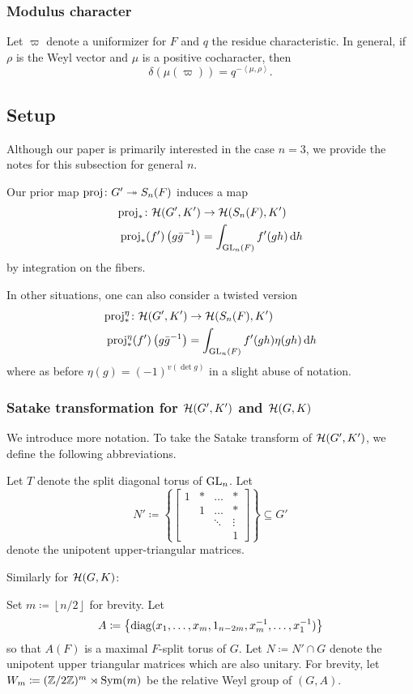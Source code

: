 \subsubsection{Modulus character}
Let $\varpi$ denote a uniformizer for $F$ and $q$ the residue characteristic.
In general, if $\rho$ is the Weyl vector and $\mu$ is a positive cocharacter, then
\[ \delta(\mu(\varpi)) = q^{- \left< \mu, \rho\right>}. \]

\subsection{Setup}
Although our paper is primarily interested in the case $n=3$,
we provide the notes for this subsection for general $n$.

Our prior map $\operatorname{proj} \colon G' \twoheadrightarrow S_n(F)$ induces a map
\begin{align*}
  \rproj_\ast \colon \HH(G', K') &\to \HH(S_n(F), K') \\
  \rproj_\ast(f')\left( g\bar{g}\inv \right) &= \int_{\GL_n(F)} f'(gh) \odif h
\end{align*}
by integration on the fibers.

In other situations, one can also consider a twisted version
\begin{align*}
  \rproj_\ast^\eta \colon \HH(G', K') &\to \HH(S_n(F), K') \\
  \rproj_\ast^\eta(f')\left( g\bar{g}\inv \right) &= \int_{\GL_n(F)} f'(gh) \eta(gh) \odif h
\end{align*}
where as before $\eta(g) = (-1)^{v(\det g)}$ in a slight abuse of notation.

\subsubsection{Satake transformation for $\mathcal H(G',K')$ and $\mathcal H(G,K)$}
We introduce more notation.
To take the Satake transform of $\mathcal H(G', K')$, we define the following abbreviations.
\begin{itemize}
  \ii Let $T$ denote the split diagonal torus of $\operatorname{GL}_n$.
  \ii Let
  \[ N' \coloneqq \left\{ \begin{bmatrix}
      1 & \ast & \dots & \ast \\
        & 1 & \dots & \ast \\
        &   & \ddots & \vdots \\
        &   &   & 1 \end{bmatrix}\right\} \subseteq G' \]
  denote the unipotent upper-triangular matrices.
\end{itemize}
Similarly for $\mathcal H(G, K)$:
\begin{itemize}
  \ii Set $m \coloneqq \left\lfloor n/2 \right\rfloor$ for brevity.
  \ii Let
  \[ A \coloneqq \left\{
    \operatorname{diag}(x_1, \dots, x_m, 1_{n-2m}, x_m^{-1}, \dots, x_1^{-1}) \right\} \]
  so that $A(F)$ is a maximal $F$-split torus of $G$.
  \ii Let $N \coloneqq N' \cap G$ denote the unipotent upper triangular matrices
  which are also unitary.
  \ii For brevity, let $W_m \coloneqq (\mathbb Z/2\mathbb Z)^m \rtimes \operatorname{Sym}(m)$
  be the relative Weyl group of $(G,A)$.
\end{itemize}

